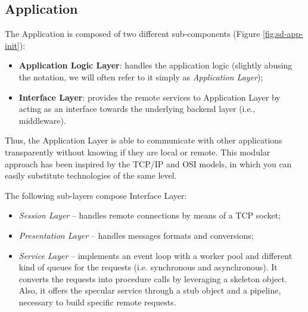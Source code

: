 \subsection{Application}
The Application is composed of two different sub-components (Figure
\ref{fig:sd-app-init}):

\begin{itemize}
  \item \textbf{Application Logic Layer}: handles the application logic
    (slightly abusing the notation, we will often refer to it simply as
    \textit{Application Layer});
  \item \textbf{Interface Layer}: provides the remote services to Application
    Layer by acting as an interface towards the underlying backend layer (i.e.,
    middleware).
\end{itemize}

Thus, the Application Layer is able to communicate with other applications
transparently without knowing if they are local or remote. This modular
approach has been inspired by the TCP/IP and OSI models, in which you can
easily substitute technologies of the same level.

The following sub-layers compose Interface Layer:

\begin{itemize}
  \item \textit{Session Layer} --
  handles remote connections by means of a TCP socket;
  \item \textit{Presentation Layer} --
  handles messages formats and conversions;
  \item \textit{Service Layer} --
  implements an event loop with a worker pool and different kind of queues
  for the requests (i.e. synchronous and asynchronous). It converts the
  requests into procedure calls by leveraging a skeleton object.
  Also, it offers the specular service through a stub object and a pipeline,
  necessary to build specific remote requests.
\end{itemize}



